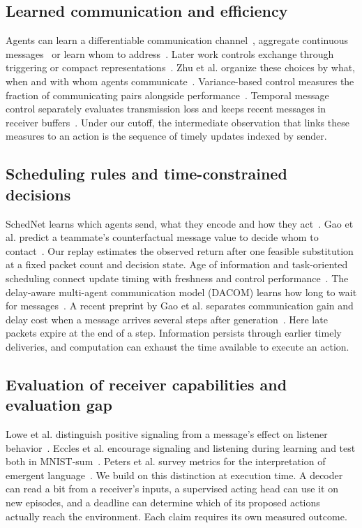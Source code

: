 \documentclass[pdflatex,sn-mathphys-num]{sn-jnl}
\begin{document}
\subsection{Learned communication and efficiency}
Agents can learn a differentiable communication channel~\citep{foerster2016learning}, aggregate continuous messages~\citep{sukhbaatar2016learning} or learn whom to address~\citep{das2019tarmac}. Later work controls exchange through triggering or compact representations~\citep{hu2023event,wang2020imac}. Zhu et al. organize these choices by what, when and with whom agents communicate~\citep{zhu2024survey}. Variance-based control measures the fraction of communicating pairs alongside performance~\citep{zhang2019efficient}. Temporal message control separately evaluates transmission loss and keeps recent messages in receiver buffers~\citep{zhang2020succinct}. Under our cutoff, the intermediate observation that links these measures to an action is the sequence of timely updates indexed by sender.

\subsection{Scheduling rules and time-constrained decisions}
SchedNet learns which agents send, what they encode and how they act~\citep{kim2019schedule}. Gao et al. predict a teammate's counterfactual message value to decide whom to contact~\citep{gao2025cmv}. Our replay estimates the observed return after one feasible substitution at a fixed packet count and decision state. Age of information and task-oriented scheduling connect update timing with freshness and control performance~\citep{kaul2012real,ayan2022semantics}. The delay-aware multi-agent communication model (DACOM) learns how long to wait for messages~\citep{yuan2023dacom}. A recent preprint by Gao et al. separates communication gain and delay cost when a message arrives several steps after generation~\citep{gao2026delay}. Here late packets expire at the end of a step. Information persists through earlier timely deliveries, and computation can exhaust the time available to execute an action.

\subsection{Evaluation of receiver capabilities and evaluation gap}
Lowe et al. distinguish positive signaling from a message's effect on listener behavior~\citep{lowe2019pitfalls}. Eccles et al. encourage signaling and listening during learning and test both in MNIST-sum~\citep{eccles2019biases}. Peters et al. survey metrics for the interpretation of emergent language~\citep{peters2025emergent}. We build on this distinction at execution time. A decoder can read a bit from a receiver's inputs, a supervised acting head can use it on new episodes, and a deadline can determine which of its proposed actions actually reach the environment. Each claim requires its own measured outcome.
\end{document}
